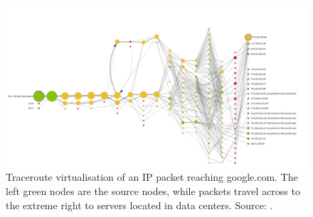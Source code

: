 \begin{figure}[ht]
\centering
\includegraphics[width=\columnwidth]{figures/traceroute}
\caption{Traceroute virtualisation of an IP packet reaching google.com. The left green nodes are the source nodes, while packets travel across to the extreme right to servers located in data centers. Source: \cite{traceroute-google}.}
\label{fig:traceroute}
\end{figure}



